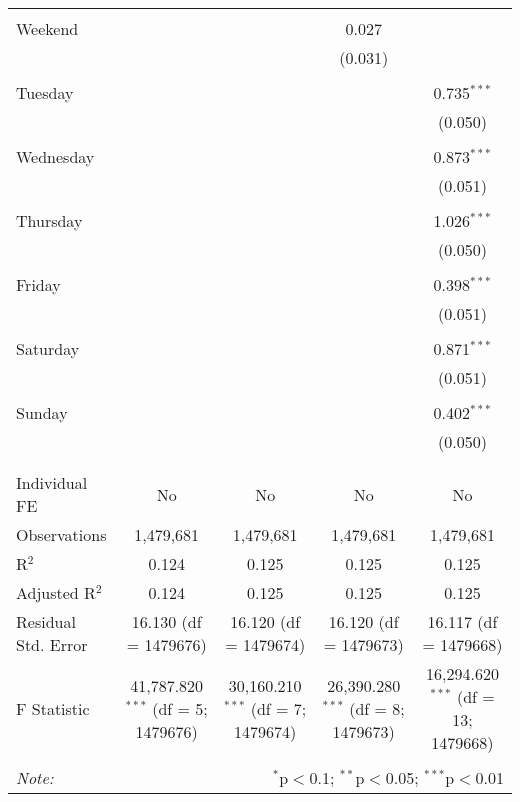 \documentclass[
]{article}
\begin{document}
\begin{table}[!htbp]
{\begin{tabular}{@{\extracolsep{5pt}}lcccc}
  & & & & \\ 
 Weekend &  &  & 0.027 &  \\ 
  &  &  & (0.031) &  \\ 
  & & & & \\ 
 Tuesday &  &  &  & 0.735$^{***}$ \\ 
  &  &  &  & (0.050) \\ 
  & & & & \\ 
 Wednesday &  &  &  & 0.873$^{***}$ \\ 
  &  &  &  & (0.051) \\ 
  & & & & \\ 
 Thursday &  &  &  & 1.026$^{***}$ \\ 
  &  &  &  & (0.050) \\ 
  & & & & \\ 
 Friday &  &  &  & 0.398$^{***}$ \\ 
  &  &  &  & (0.051) \\ 
  & & & & \\ 
 Saturday &  &  &  & 0.871$^{***}$ \\ 
  &  &  &  & (0.051) \\ 
  & & & & \\ 
 Sunday &  &  &  & 0.402$^{***}$ \\ 
  &  &  &  & (0.050) \\ 
  & & & & \\ 
\hline \\[-1.8ex] 
Individual FE & No & No & No & No \\ 
Observations & 1,479,681 & 1,479,681 & 1,479,681 & 1,479,681 \\ 
R$^{2}$ & 0.124 & 0.125 & 0.125 & 0.125 \\ 
Adjusted R$^{2}$ & 0.124 & 0.125 & 0.125 & 0.125 \\ 
Residual Std. Error & 16.130 (df = 1479676) & 16.120 (df = 1479674) & 16.120 (df = 1479673) & 16.117 (df = 1479668) \\ 
F Statistic & 41,787.820$^{***}$ (df = 5; 1479676) & 30,160.210$^{***}$ (df = 7; 1479674) & 26,390.280$^{***}$ (df = 8; 1479673) & 16,294.620$^{***}$ (df = 13; 1479668) \\ 
\hline 
\hline \\[-1.8ex] 
\textit{Note:}  & \multicolumn{4}{r}{$^{*}$p$<$0.1; $^{**}$p$<$0.05; $^{***}$p$<$0.01} \\ 
\end{tabular}
} 
\end{table} 
\newpage
\end{document}
